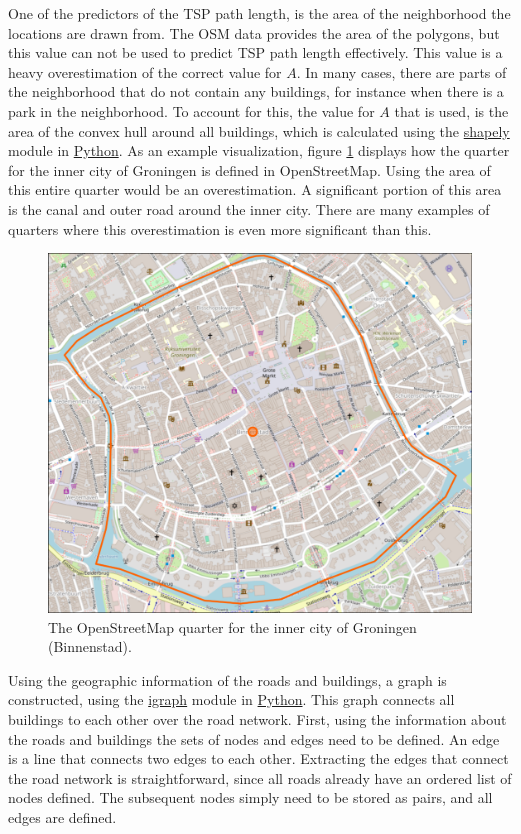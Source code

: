 One of the predictors of the TSP path length, is the area of the neighborhood
the locations are drawn from. The OSM data provides the area of the polygons,
but this value can not be used to predict TSP path length effectively.
This value is a heavy overestimation of the correct value for $A$.
In many cases, there are parts of the neighborhood that do not contain
any buildings, for instance when there is a park in the neighborhood. To
account for this, the value for $A$ that is used, is the area of the convex
hull around all buildings, which is calculated using the \url{shapely}
module in \url{Python}. As an example visualization, figure \ref{fig:binnenstad_quarter} displays
how the quarter for the inner city of Groningen is defined in OpenStreetMap. Using the area of this
entire quarter would be an overestimation. A significant portion of this area is the canal and outer
road around the inner city. There are many examples of quarters where this overestimation is even
more significant than this.
\begin{figure}[H]
  \caption{The OpenStreetMap quarter for the inner city of Groningen (Binnenstad). \citep{openstreetmap}}
  \label{fig:binnenstad_quarter}
  \includegraphics[width=\textwidth]{Pictures/Binnenstad_quarter.png}
\end{figure}
Using the geographic information of the roads and buildings, a graph
is constructed, using the \url{igraph} module in \url{Python}. This graph
connects all buildings to each other over the road network. First, using the information about the 
roads and buildings the sets of nodes and edges need to be defined. An edge is a line that connects
two edges to each other. Extracting the edges that connect the road network is straightforward,
since all roads already have an ordered list of nodes defined. The subsequent nodes simply need to
be stored as pairs, and all edges are defined.

